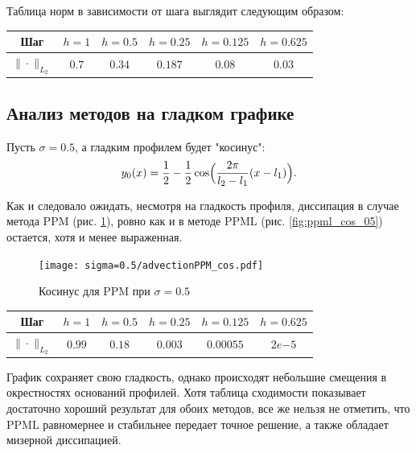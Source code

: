 \documentclass[12pt,a4paper]{article}
\newcommand{\picref}[1]{рис. \ref{#1}}
\begin{document}
    Таблица норм в зависимости от шага выглядит следующим образом:

    \begin{center}
        \begin{tabular}{ |c|c|c|c|c|c| } 
         \hline
         Шаг & $ h=1 $ &  $ h=0.5$ &  $ h=0.25 $ &  $ h=0.125 $ &  $ h=0.625 $ \\ 
         \hline
         $\| \cdot \|_{L_2}$ & $0.7$ & $0.34$ & $0.187$ & $0.08$ & $0.03$ \\
         \hline
        \end{tabular}
    \end{center}

    \subsection{Анализ методов на гладком графике}

    Пусть $ \sigma = 0.5 $, а гладким профилем будет "косинус":
    \[
        y_0(x) = \dfrac{1}{2} - \dfrac{1}{2} \cos\Bigl(\dfrac{2 \pi}{l_2 - l_1}(x-l_1)\Bigr).
    \]

    Как и следовало ожидать, несмотря на гладкость профиля, диссипация в случае метода PPM (\picref{fig:ppm_cos_05}), ровно как и в методе PPML (\picref{fig:ppml_cos_05}) остается, хотя и менее выраженная. 

    \pagebreak

    \begin{figure}[h]
        \centering
        \texttt{[image: sigma=0.5/advectionPPM\_cos.pdf]}
        \caption{Косинус для PPM при $ \sigma = 0.5 $}
        \label{fig:ppm_cos_05}
    \end{figure}

    \begin{center}
        \begin{tabular}{ |c|c|c|c|c|c| } 
         \hline
         Шаг & $ h=1 $ &  $ h=0.5$ &  $ h=0.25 $ &  $ h=0.125 $ &  $ h=0.625 $ \\ 
         \hline
         $\| \cdot \|_{L_2}$ & $0.99$ & $0.18$ & $0.003$ & $0.00055$ & $2e{-5}$ \\
         \hline
        \end{tabular}
    \end{center}

    График сохраняет свою гладкость, однако происходят небольшие смещения в окрестностях оснований профилей. Хотя таблица сходимости показывает достаточно хороший результат для обоих методов, все же нельзя не отметить, что PPML равномернее и стабильнее передает точное решение, а также обладает мизерной диссипацией. 
\end{document}
